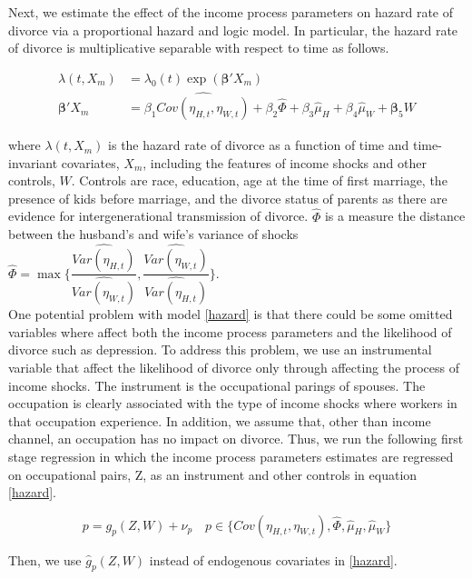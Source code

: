 Next, we estimate the effect of the income process parameters on hazard rate of divorce via a proportional hazard and logic model. In particular, the hazard rate of divorce is multiplicative separable with respect to time as follows. 

\begin{align*}
\lambda(t, X_m) &= \lambda_0(t) \exp(\boldsymbol \beta' X_m) \label{hazard}\\
\boldsymbol \beta' X_m &= \beta_1 \widehat {Cov(\eta_{H,t},\eta_{W,t})} + \beta_2 \hat \Phi + \beta_3 \hat \mu_H + \beta_4 \hat \mu_W + \boldsymbol \beta_5 W
\end{align*}

\noindent where $\lambda(t, X_m)$ is the hazard rate of divorce as a function of time and time-invariant covariates, $X_m$, including the features of income shocks and other controls, $W$. Controls are race, education, age at the time of first marriage, the presence of kids before marriage, and the divorce status of parents as there are evidence for intergenerational transmission of divorce. $\hat \Phi$ is a measure the distance between the husband's and wife's variance of shocks 
$\hat \Phi = \max \{\dfrac{\widehat {Var(\eta_{H,t})}}{\widehat{ Var(\eta_{W,t})}}, \dfrac{\widehat {Var(\eta_{W,t})}}{\widehat{ Var(\eta_{H,t})}}\}$. \\

One potential problem with model \eqref{hazard} is that there could be some omitted variables where affect both the income process parameters and the likelihood of divorce such as depression. To address this problem, we use an instrumental variable that affect the likelihood of divorce only through affecting the process of income shocks. The instrument is the occupational parings of spouses. The occupation is clearly associated with the type of income shocks where workers in that occupation experience. In addition, we assume that, other than income channel, an occupation has no impact on divorce.  Thus, we run the following first stage regression in which the income process parameters estimates are regressed on occupational pairs, Z, as an instrument and other controls in equation \eqref{hazard}. 

\begin{equation*}
p = g_p(Z, W) +\nu_p \quad p \in \{Cov(\eta_{H,t},\eta_{W,t}), \hat \Phi, \hat \mu_H, \hat \mu_W \}
\end{equation*}

Then, we use $\hat g_p(Z, W)$ instead of endogenous covariates in \eqref{hazard}. \\



